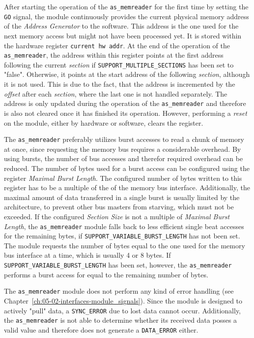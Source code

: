 After starting the operation of the \texttt{as\_memreader} for the first time by setting the \texttt{GO} signal, the module continuously provides the current physical memory address of the \textit{Address Generator} to the software.
This address is the one used for the next memory access but might not have been processed yet.
It is stored within the hardware register \texttt{current hw addr}.
At the end of the operation of the \texttt{as\_memreader}, the address within this register points at the first address following the current \textit{section} if \texttt{SUPPORT\_MULTIPLE\_SECTIONS} has been set to "false".
Otherwise, it points at the start address of the following \textit{section}, although it is not used.
This is due to the fact, that the address is incremented by the \textit{offset} after each \textit{section}, where the last one is not handled separately.
The address is only updated during the operation of the \texttt{as\_memreader} and therefore is also not cleared once it has finished its operation.
However, performing a \textit{reset} on the module, either by hardware or software, clears the register.


The \texttt{as\_memreader} preferably utilizes burst accesses to read a chunk of memory at once, since requesting the memory bus requires a considerable overhead.
By using bursts, the number of bus accesses and therefor required overhead can be reduced.
The number of bytes used for a burst access can be configured using the register \textit{Maximal Burst Length}.
The configured number of bytes written to this register has to be a multiple of the of the memory bus interface.
Additionally, the maximal amount of data transferred in a single burst is usually limited by the architecture, to prevent other bus masters from starving, which must not be exceeded.
If the configured \textit{Section Size} is not a multiple of \textit{Maximal Burst Length}, the \texttt{as\_memreader} module falls back to less efficient single beat accesses for the remaining bytes, if \texttt{SUPPORT\_VARIABLE\_BURST\_LENGTH} has not been set.
The module requests the number of bytes equal to the one used for the memory bus interface at a time, which is usually 4 or 8 bytes.
If \texttt{SUPPORT\_VARIABLE\_BURST\_LENGTH} has been set, however, the \texttt{as\_memreader} performs a burst access for equal to the remaining number of bytes.\newline


The \texttt{as\_memreader} module does not perform any kind of error handling (see Chapter~\ref{ch:05-02-interfaces-module_signals}).
Since the module is designed to actively "pull" data, a \texttt{SYNC\_ERROR} due to lost data cannot occur.
Additionally, the \texttt{as\_memreader} is not able to determine whether its received data posses a valid value and therefore does not generate a \texttt{DATA\_ERROR} either.


